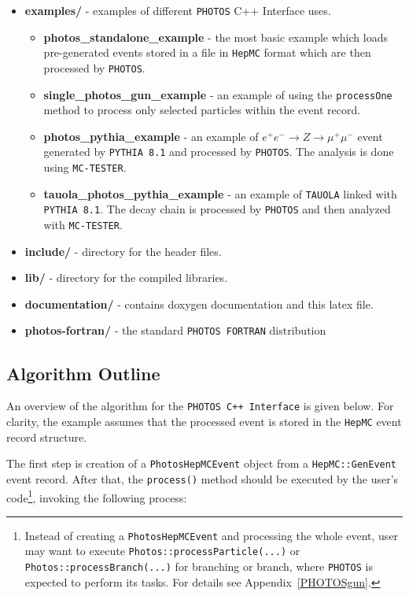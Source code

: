 \documentclass[]{Photos_interface_design}
\begin{document}
\begin{itemize}
  \item {\bf examples/ } - examples of different {\tt PHOTOS} C++ Interface uses.
    \begin{itemize}
	\item {\bf photos\_standalone\_example} - the most basic example which loads pre-generated 
	      events stored in a file in {\tt HepMC} format which are then processed by {\tt PHOTOS}.
	\item {\bf single\_photos\_gun\_example} - an example of using the {\tt processOne} method
	      to process only selected particles within the event record.
    \item {\bf photos\_pythia\_example} - an example of $e^+e^- \rightarrow Z \rightarrow \mu^+\mu^-$ event
	generated by {\tt PYTHIA 8.1} and processed by {\tt PHOTOS}. The analysis is done using {\tt MC-TESTER}.
    \item {\bf tauola\_photos\_pythia\_example } - an example of  {\tt TAUOLA} linked with {\tt PYTHIA 8.1}.
	The decay chain is processed by {\tt PHOTOS} and then analyzed with {\tt MC-TESTER}.
    \end{itemize}   
  \item {\bf include/} - directory for the header files.
  \item {\bf lib/ } - directory for the compiled  libraries. 
  \item {\bf documentation/ } - contains doxygen documentation and this latex file.
  \item {\bf photos-fortran/ } - the  standard {\tt PHOTOS FORTRAN} distribution
\end{itemize}

\subsection{Algorithm Outline}
\label{sect:Outline}

An overview of the algorithm for  the {\tt PHOTOS C++ Interface} is
given below. For clarity, the example assumes that the processed event
is stored in the {\tt HepMC} event record structure.

The first step is creation of a {\tt PhotosHepMCEvent} object from
a {\tt HepMC::GenEvent} event record. After that, the {\tt process()} method should
be executed by the user's code\footnote{Instead of creating a {\tt PhotosHepMCEvent} and processing the whole event,
user may want to execute {\tt Photos::processParticle(...)} or {\tt Photos::processBranch(...)}
for branching or branch, where {\tt PHOTOS} is expected to perform its tasks.
For details see Appendix~\ref{PHOTOSgun}.
}, invoking the following process:
\end{document}
